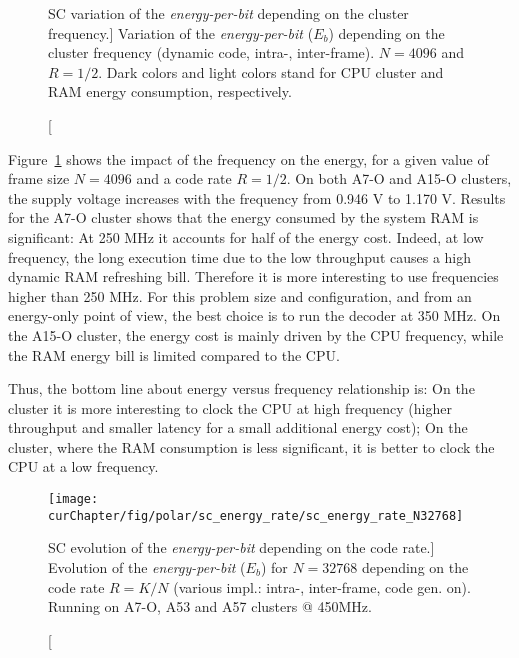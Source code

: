 \begin{figure}[htp]
  \centering
  \quad
  \caption
    [SC variation of the \emph{energy-per-bit} depending on the cluster
    frequency.]
    {Variation of the \emph{energy-per-bit} ($E_b$) depending on the cluster
    frequency (dynamic code, intra-, inter-frame). $N = 4096$ and $R = 1/2$.
    Dark colors and light colors stand for CPU cluster and RAM energy
    consumption, respectively.}
  \label{plot:eval_polar_sc_energy_freq}
\end{figure}

Figure~\ref{plot:eval_polar_sc_energy_freq} shows the impact of the frequency on
the energy, for a given value of frame size $N=4096$ and a code rate $R=1/2$. On
both A7-O and A15-O clusters, the supply voltage increases with the frequency
from 0.946 V to 1.170 V. Results for the A7-O \little cluster shows that the
energy consumed by the system RAM is significant: At 250 MHz it accounts for
half of the energy cost. Indeed, at low frequency, the long execution time due
to the low throughput causes a high dynamic RAM refreshing bill. Therefore it is
more interesting to use frequencies higher than 250 MHz. For this problem size
and configuration, and from an energy-only point of view, the best choice is to
run the decoder at 350 MHz. On the A15-O \bigARM cluster, the energy cost is
mainly driven by the CPU frequency, while the RAM energy bill is limited
compared to the CPU.

Thus, the bottom line about energy versus frequency relationship is: On the \little
cluster it is more interesting to clock the CPU at high frequency (higher
throughput and smaller latency for a small additional energy cost); On the
\bigARM cluster, where the RAM consumption is less significant, it is better to
clock the CPU at a low frequency.

\begin{figure}[htp]
  \centering
  \texttt{[image: \\curChapter/fig/polar/sc\_energy\_rate/sc\_energy\_rate\_N32768]}
  \caption
    [SC evolution of the \emph{energy-per-bit} depending on the code rate.]
    {Evolution of the \emph{energy-per-bit} ($E_b$) for $N = 32768$ depending on
    the code rate $R = K / N$ (various impl.: intra-, inter-frame, code gen.
    on). Running on A7-O, A53 and A57 clusters @ 450MHz.}
  \label{plot:eval_polar_sc_energy_rate}
\end{figure}

